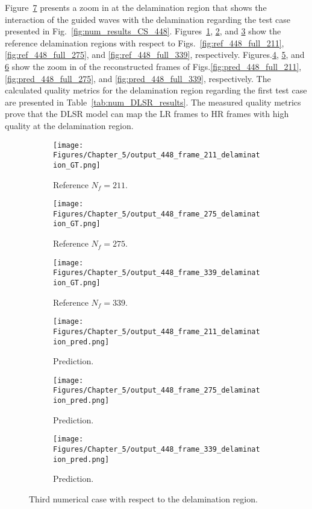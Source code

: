 Figure~\ref{fig:num_results_CS_damage_area_448} presents a zoom in at the delamination region that shows the interaction of the guided waves with the delamination regarding the test case presented in Fig.~\ref{fig:num_results_CS_448}.
Figures~\ref{fig:ref_448_damage_211}, \ref{fig:ref_448_damage_275}, and \ref{fig:ref_448_damage_339} show the reference delamination regions with respect to Figs.~\ref{fig:ref_448_full_211}, \ref{fig:ref_448_full_275}, and \ref{fig:ref_448_full_339}, respectively.
Figures.\ref{fig:pred_448_damage_211}, \ref{fig:pred_448_damage_275}, and \ref{fig:pred_448_damage_339} show the zoom in of the reconstructed frames of Figs.\ref{fig:pred_448_full_211}, \ref{fig:pred_448_full_275}, and \ref{fig:pred_448_full_339}, respectively.
The calculated quality metrics for the delamination region regarding the first test case are presented in Table~\ref{tab:num_DLSR_results}.
The measured quality metrics prove that the DLSR model can map the LR frames to HR frames with high quality at the delamination region.
\begin{figure} [!ht]
	\centering
	\begin{subfigure}[b]{.32\textwidth}
		\centering
		\texttt{[image: Figures/Chapter\_5/output\_448\_frame\_211\_delamination\_GT.png]}
		\caption{Reference $N_f=211$.}
		\label{fig:ref_448_damage_211}
	\end{subfigure}
	\begin{subfigure}[b]{.32\textwidth}
		\centering
		\texttt{[image: Figures/Chapter\_5/output\_448\_frame\_275\_delamination\_GT.png]}
		\caption{Reference $N_f=275$.}
		\label{fig:ref_448_damage_275}
	\end{subfigure}
	\begin{subfigure}[b]{.32\textwidth}
		\centering
		\texttt{[image: Figures/Chapter\_5/output\_448\_frame\_339\_delamination\_GT.png]}
		\caption{Reference $N_f=339$.}
		\label{fig:ref_448_damage_339}	
	\end{subfigure}
	\begin{subfigure}[b]{.32\textwidth}
		\centering
		\texttt{[image: Figures/Chapter\_5/output\_448\_frame\_211\_delamination\_pred.png]}
		\caption{Prediction.}
		\label{fig:pred_448_damage_211}
	\end{subfigure}
	\begin{subfigure}[b]{.32\textwidth}
		\centering
		\texttt{[image: Figures/Chapter\_5/output\_448\_frame\_275\_delamination\_pred.png]}
		\caption{Prediction.}
		\label{fig:pred_448_damage_275}
	\end{subfigure}
	\begin{subfigure}[b]{.32\textwidth}
		\centering
		\texttt{[image: Figures/Chapter\_5/output\_448\_frame\_339\_delamination\_pred.png]}
		\caption{Prediction.}
		\label{fig:pred_448_damage_339}	
	\end{subfigure}
	\caption{Third numerical case with respect to the delamination region.}
	\label{fig:num_results_CS_damage_area_448}
\end{figure}

